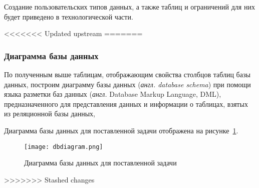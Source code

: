 \clearpage

Создание пользовательских типов данных, а также таблиц и ограничений для них будет приведено в технологической части. 

<<<<<<< Updated upstream
=======
\subsubsection{Диаграмма базы данных}

По полученным выше таблицам, отображающим свойства столбцов таблиц базы данных, построим диаграмму базы данных (\textit{англ. database schema}) при помощи языка разметки баз данных (\textit{англ.} Database Markup Language, DML), предназначенного для представления данных и информации о таблицах, взятых из реляционной базы данных,

Диаграмма базы данных для поставленной задачи отображена на рисунке~\ref{fig:dbdiagram}.

\begin{figure}[h!]
	\centering
	\captionsetup{justification=centering}
	\texttt{[image: dbdiagram.png]}
	\caption{Диаграмма базы данных для поставленной задачи}
	\label{fig:dbdiagram}
\end{figure}

\clearpage
>>>>>>> Stashed changes


